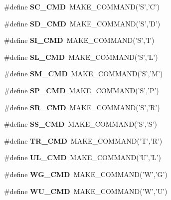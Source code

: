 \begin{CompactItemize}
\item 
\#define \textbf{SC\_\-CMD}~MAKE\_\-COMMAND('S','C')\label{hpgsreader_8h_56959c6d741cf2385a9e3e371c998795}

\item 
\#define \textbf{SD\_\-CMD}~MAKE\_\-COMMAND('S','D')\label{hpgsreader_8h_3a714a780ec94c00437096eee9f49716}

\item 
\#define \textbf{SI\_\-CMD}~MAKE\_\-COMMAND('S','I')\label{hpgsreader_8h_2c486800b74c3f310e4dc777acae957a}

\item 
\#define \textbf{SL\_\-CMD}~MAKE\_\-COMMAND('S','L')\label{hpgsreader_8h_bb05ae88dd8995ac8e1b302a792612c7}

\item 
\#define \textbf{SM\_\-CMD}~MAKE\_\-COMMAND('S','M')\label{hpgsreader_8h_1fc7af83959a967c7af7236ba1999833}

\item 
\#define \textbf{SP\_\-CMD}~MAKE\_\-COMMAND('S','P')\label{hpgsreader_8h_238d5dba110652313b5b0bd4374921a4}

\item 
\#define \textbf{SR\_\-CMD}~MAKE\_\-COMMAND('S','R')\label{hpgsreader_8h_d3465143c05373320a4af026815037f3}

\item 
\#define \textbf{SS\_\-CMD}~MAKE\_\-COMMAND('S','S')\label{hpgsreader_8h_b610fdaab244557cdcd355b330121963}

\item 
\#define \textbf{TR\_\-CMD}~MAKE\_\-COMMAND('T','R')\label{hpgsreader_8h_f6601cf20799d3ce9ff7a6dd92a8ef17}

\item 
\#define \textbf{UL\_\-CMD}~MAKE\_\-COMMAND('U','L')\label{hpgsreader_8h_d90c8439ec9229b38140b8271d4afd19}

\item 
\#define \textbf{WG\_\-CMD}~MAKE\_\-COMMAND('W','G')\label{hpgsreader_8h_d3f341bed7d3d5bc787c0b6a48b58978}

\item 
\#define \textbf{WU\_\-CMD}~MAKE\_\-COMMAND('W','U')\label{hpgsreader_8h_79de8678b6b33dda1e6602cd6d0f536f}

\end{CompactItemize}
